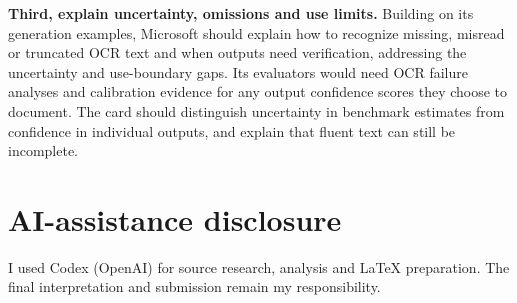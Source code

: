 \documentclass[11pt,letterpaper]{article}
\begin{document}
\textbf{Third, explain uncertainty, omissions and use limits.} Building on its generation examples, Microsoft should explain how to recognize missing, misread or truncated OCR text and when outputs need verification, addressing the uncertainty and use-boundary gaps. Its evaluators would need OCR failure analyses and calibration evidence for any output confidence scores they choose to document. The card should distinguish uncertainty in benchmark estimates from confidence in individual outputs, and explain that fluent text can still be incomplete.

\clearpage
\begingroup
\raggedright


\endgroup

\section*{AI-assistance disclosure}
I used Codex (OpenAI) for source research, analysis and LaTeX preparation. The final interpretation and submission remain my responsibility.
\end{document}
